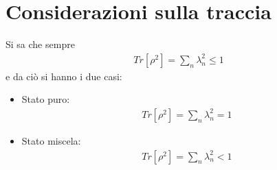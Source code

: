 \section{Considerazioni sulla traccia} %
Si sa che sempre
\begin{equation}\begin{split}
Tr\left[\rho^2\right]=\sum_n{\lambda_n^2}\le 1
\end{split}\end{equation}
e da ciò si hanno i due casi:
\begin{itemize}
\item Stato puro:
\begin{equation}\begin{split}
Tr\left[\rho^2\right]=\sum_n{\lambda_n^2}= 1
\end{split}\end{equation}
\item Stato miscela:
\begin{equation}\begin{split}
Tr\left[\rho^2\right]=\sum_n{\lambda_n^2}< 1
\end{split}\end{equation}
\end{itemize}
